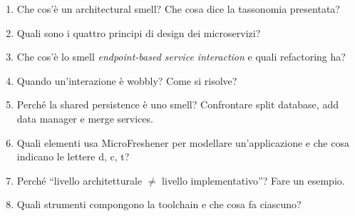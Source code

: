 \begin{domande}
\begin{enumerate}
  \item Che cos'è un architectural smell? Che cosa dice la tassonomia presentata?
  \item Quali sono i quattro principi di design dei microservizi?
  \item Che cos'è lo smell \emph{endpoint-based service interaction} e quali refactoring ha?
  \item Quando un'interazione è wobbly? Come si risolve?
  \item Perché la shared persistence è uno smell? Confrontare split database, add data manager e merge services.
  \item Quali elementi usa MicroFreshener per modellare un'applicazione e che cosa indicano le lettere d, c, t?
  \item Perché ``livello architetturale $\neq$ livello implementativo''? Fare un esempio.
  \item Quali strumenti compongono la toolchain e che cosa fa ciascuno?
\end{enumerate}
\end{domande}
